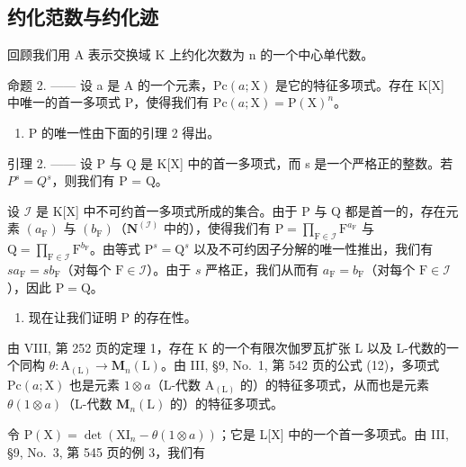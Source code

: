 \subsection{约化范数与约化迹}

回顾我们用 A 表示交换域 K 上约化次数为 n 的一个中心单代数。

命题 2. —— 设 a 是 A 的一个元素，\(\mathrm{Pc}(a;\mathrm{X})\) 是它的特征多项式。存在 K{[}X{]} 中唯一的首一多项式 P，使得我们有 \(\mathrm{Pc}(a;\mathrm{X})=\mathrm{P}(\mathrm{X})^{n}\)。

\begin{enumerate}
\def\labelenumi{\Alph{enumi})}
\tightlist
\item
  P 的唯一性由下面的引理 2 得出。
\end{enumerate}

引理 2. —— 设 P 与 Q 是 K{[}X{]} 中的首一多项式，而 s 是一个严格正的整数。若 \(P^{s} = Q^{s}\)，则我们有 P = Q。

设 \(\mathcal{I}\) 是 K{[}X{]} 中不可约首一多项式所成的集合。由于 P 与 Q 都是首一的，存在元素 \((a_{\mathrm{F}})\) 与 \((b_{\mathrm{F}})\)（\(\mathbf{N}^{(\mathcal{I})}\) 中的），使得我们有 \(\mathrm{P} = \prod_{\mathrm{F} \in \mathcal{I}} \mathrm{F}^{a_{\mathrm{F}}}\) 与 \(\mathrm{Q} = \prod_{\mathrm{F} \in \mathcal{I}} \mathrm{F}^{b_{\mathrm{F}}}\)。由等式 \(\mathrm{P}^s = \mathrm{Q}^s\) 以及不可约因子分解的唯一性推出，我们有 \(sa_{\mathrm{F}} = sb_{\mathrm{F}}\)（对每个 \(\mathrm{F} \in \mathcal{I}\)）。由于 \(s\) 严格正，我们从而有 \(a_{\mathrm{F}} = b_{\mathrm{F}}\)（对每个 \(\mathrm{F} \in \mathcal{I}\)），因此 \(\mathrm{P} = \mathrm{Q}\)。

\begin{enumerate}
\def\labelenumi{\Alph{enumi})}
\setcounter{enumi}{1}
\tightlist
\item
  现在让我们证明 P 的存在性。
\end{enumerate}

由 VIII, 第 252 页的定理 1，存在 K 的一个有限次伽罗瓦扩张 L 以及 L-代数的一个同构 \(\theta : \mathrm{A}_{(\mathrm{L})} \to \mathbf{M}_n(\mathrm{L})\)。由 III, §9, No.~1, 第 542 页的公式 (12)，多项式 \(\mathrm{Pc}(a; \mathrm{X})\) 也是元素 \(1 \otimes a\)（L-代数 \(\mathrm{A}_{(\mathrm{L})}\) 的）的特征多项式，从而也是元素 \(\theta(1 \otimes a)\)（L-代数 \(\mathbf{M}_n(\mathrm{L})\) 的）的特征多项式。

令 \(\mathrm{P}(\mathrm{X})=\det(\mathrm{XI}_{n}-\theta(1\otimes a))\)；它是 L{[}X{]} 中的一个首一多项式。由 III, §9, No.~3, 第 545 页的例 3，我们有

